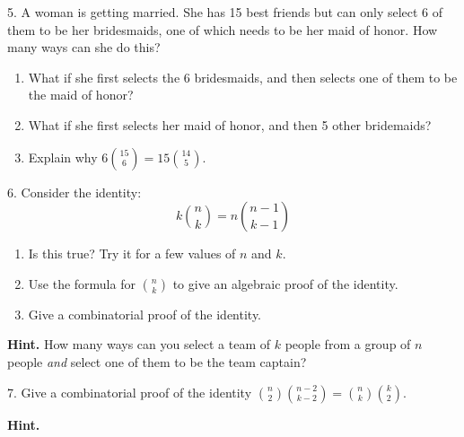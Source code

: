 \documentclass[10pt,]{book}
\theoremstyle{plain}
\theoremstyle{definition}
\numberwithin{equation}{chapter}
\begin{document}
\begin{exerciselist}
\begin{enumerate}[label=(\alph*)]
\end{enumerate}

\par\smallskip
\item[5.]\hypertarget{exercise-87}{}
          A woman is getting married. She has 15 best friends but can only select 6 of them to be her bridesmaids, one of which needs to be her maid of honor. How many ways can she do this?
        \leavevmode%
\begin{enumerate}[label=(\alph*)]
\item\hypertarget{li-294}{} What if she first selects the 6 bridesmaids, and then selects one of them to be the maid of honor? %
\item\hypertarget{li-295}{} What if she first selects her maid of honor, and then 5 other bridemaids? %
\item\hypertarget{li-296}{} Explain why \(6 {15 \choose 6} = 15 {14 \choose 5}\). %
\end{enumerate}

\par\smallskip
\item[6.]\hypertarget{exercise-88}{}
          Consider the identity:
          \begin{equation*}
            k{n\choose k} = n{n-1 \choose k-1}
          \end{equation*}
        \leavevmode%
\begin{enumerate}[label=(\alph*)]
\item\hypertarget{li-300}{}
              Is this true? Try it for a few values of \(n\) and \(k\).


\item\hypertarget{li-301}{}
              Use the formula for \({n \choose k}\) to give an algebraic proof of the identity.


\item\hypertarget{li-302}{}
              Give a combinatorial proof of the identity.


\end{enumerate}

\par\smallskip
\par\smallskip
\noindent\textbf{Hint.}\hypertarget{hint-7}{}\quad
How many ways can you select a team of \(k\) people from a group of \(n\) people \emph{and} select one of them to be the team captain?\item[7.]\hypertarget{exercise-89}{}
          Give a combinatorial proof of the identity \({n \choose 2}{n-2 \choose k-2} = {n\choose k}{k \choose 2}\).
\par\smallskip
\par\smallskip
\noindent\textbf{Hint.}\hypertarget{hint-8}{}\quad


\end{exerciselist}
\end{document}
